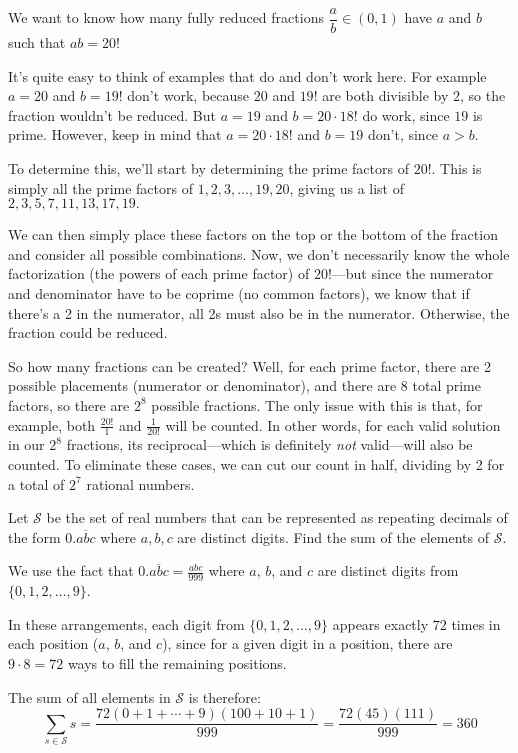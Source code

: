 \begin{solution}[\(2^7\)]
    We want to know how many fully reduced fractions \(\dfrac{a}{b}\in(0,1)\) have \(a\) and \(b\) such that \( ab = 20! \)

    It's quite easy to think of examples that do and don't work here. For example \(a=20\) and \(b=19!\) don't work, because \(20\) and \(19!\) are both divisible by \(2\), so the fraction wouldn't be reduced. But \(a=19\) and \(b=20\cdot18!\) do work, since \(19\) is prime. However, keep in mind that \(a=20\cdot18!\) and \(b=19\) don't, since \(a>b\).
    
    To determine this, we'll start by determining the prime factors of \(20!\). This is simply all the prime factors of \(1, 2, 3, \dots, 19,  20\), giving us a list of \( 2, 3, 5, 7, 11, 13, 17, 19.\)
    
    We can then simply place these factors on the top or the bottom of the fraction and consider all possible combinations. Now, we don't necessarily know the whole factorization (the powers of each prime factor) of \(20!\)---but since the numerator and denominator have to be coprime (no common factors), we know that if there's a 2 in the numerator, all 2s must also be in the numerator. Otherwise, the fraction could be reduced.

    So how many fractions can be created? Well, for each prime factor, there are 2 possible placements (numerator or denominator), and there are 8 total prime factors, so there are \(2^8\) possible fractions. The only issue with this is that, for example, both \( \frac{20!}{1} \) and \( \frac{1}{20!} \) will be counted. In other words, for each valid solution in our \(2^8\) fractions, its reciprocal---which is definitely \emph{not} valid---will also be counted. To eliminate these cases, we can cut our count in half, dividing by 2 for a total of \(\boxed{2^7}\) rational numbers.
\end{solution}

\begin{problem}[C][2][AIME 2006/6]
    Let $\mathcal{S}$ be the set of real numbers that can be represented as repeating decimals of the form $0.\overline{abc}$ where $a,b,c$ are distinct digits. Find the sum of the elements of $\mathcal{S}$.    
\end{problem}

\begin{solution}[360]
We use the fact that $0.\overline{abc} = \frac{abc}{999}$ where $a$, $b$, and $c$ are distinct digits from $\{0,1,2,\dots,9\}$.

In these arrangements, each digit from $\{0,1,2,\dots,9\}$ appears exactly $72$ times in each position ($a$, $b$, and $c$), since for a given digit in a position, there are $9 \cdot 8 = 72$ ways to fill the remaining positions.

The sum of all elements in $\mathcal{S}$ is therefore:
\[
\sum_{s \in \mathcal{S}} s = \frac{72(0+1+\cdots+9)(100+10+1)}{999} = \frac{72(45)(111)}{999} = \boxed{360}
\]
\end{solution}

